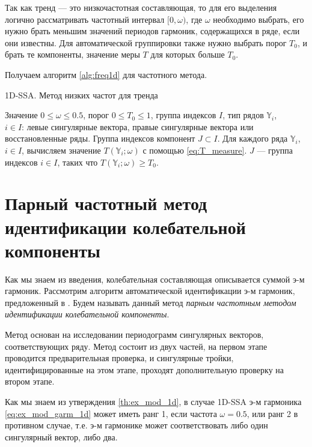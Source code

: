 \documentclass[specialist,
               substylefile = spbu.rtx,
               subf,href,colorlinks=true, 12pt]{disser}
\begin{document}
Так как тренд --- это низкочастотная составляющая, то для его выделения логично рассматривать частотный интервал $[0, \omega)$, где $\omega$ необходимо выбрать, его нужно брать меньшим значений периодов гармоник, содержащихся в ряде, если они известны. 
Для автоматической группировки также нужно выбрать порог $T_0$, и брать те компоненты, значение меры $T$ для которых больше $T_0$.

Получаем алгоритм \ref{alg:freq1d} для частотного метода.

\begin{algorithm}[!hhh]
\caption{1D-SSA. Метод низких частот для тренда}
\label{alg:freq1d}
\begin{algorithmic}[1]
\REQUIRE Значение  $0 \leqslant  \omega \leqslant 0.5$, порог $0 \leqslant T_0 \leqslant 1$, группа индексов $I$, тип рядов $\mathbb{Y}_i$,\\ $i \in I$: левые сингулярные вектора, 
правые сингулярные вектора или восстановленные ряды.
\ENSURE Группа индексов компонент $J \subset I$.
\STATE  Для каждого ряда $\mathbb{Y}_i$, $i \in I$, вычисляем значение $T(\mathbb{Y}_i; \omega)$ с помощью \eqref{eq:T_measure}.
\STATE $J$ --- группа индексов $i \in I$, таких что $T(\mathbb{Y}_i; \omega) \geqslant T_0$.
\end{algorithmic}
\end{algorithm}

\section{Парный частотный метод идентификации колебательной компоненты}
\label{sec:1d_pgram_method}

Как мы знаем из введения, колебательная составляющая описывается суммой э-м гармоник.
Рассмотрим алгоритм автоматической идентификации э-м гармоник, предложенный в \cite{Alexandrov2006}. 
 Будем называть данный метод \textit{парным частотным методом идентификации колебательной компоненты}.

Метод основан на исследовании периодограмм сингулярных векторов, соответствующих ряду. Метод состоит из двух частей, на первом этапе проводится предварительная проверка, и сингулярные тройки, идентифицированные на этом этапе, проходят дополнительную проверку на втором этапе. 

Как мы знаем из утверждения \ref{th:ex_mod_1d}, в случае 1D-SSA э-м гармоника \eqref{eq:ex_mod_garm_1d} может иметь ранг 1, если частота $\omega=0.5$, или ранг 2 в противном случае, т.е. э-м гармонике может соответствовать либо один сингулярный вектор, либо два.
\end{document}
